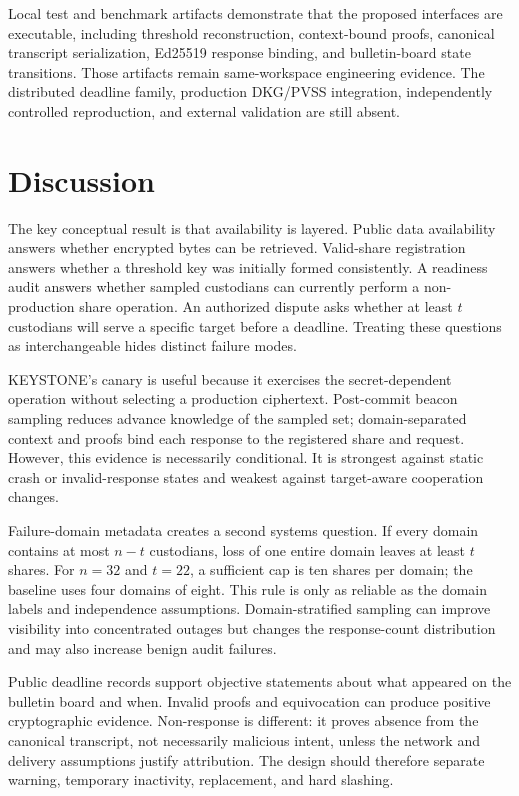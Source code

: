 \documentclass[10pt]{article}
\begin{document}
Local test and benchmark artifacts demonstrate that the proposed interfaces are executable, including threshold reconstruction, context-bound proofs, canonical transcript serialization, Ed25519 response binding, and bulletin-board state transitions. Those artifacts remain same-workspace engineering evidence. The distributed deadline family, production DKG/PVSS integration, independently controlled reproduction, and external validation are still absent.

\section{Discussion}

The key conceptual result is that availability is layered. Public data availability answers whether encrypted bytes can be retrieved. Valid-share registration answers whether a threshold key was initially formed consistently. A readiness audit answers whether sampled custodians can currently perform a non-production share operation. An authorized dispute asks whether at least $t$ custodians will serve a specific target before a deadline. Treating these questions as interchangeable hides distinct failure modes.

KEYSTONE's canary is useful because it exercises the secret-dependent operation without selecting a production ciphertext. Post-commit beacon sampling reduces advance knowledge of the sampled set; domain-separated context and proofs bind each response to the registered share and request. However, this evidence is necessarily conditional. It is strongest against static crash or invalid-response states and weakest against target-aware cooperation changes.

Failure-domain metadata creates a second systems question. If every domain contains at most $n-t$ custodians, loss of one entire domain leaves at least $t$ shares. For $n=32$ and $t=22$, a sufficient cap is ten shares per domain; the baseline uses four domains of eight. This rule is only as reliable as the domain labels and independence assumptions. Domain-stratified sampling can improve visibility into concentrated outages but changes the response-count distribution and may also increase benign audit failures.

Public deadline records support objective statements about what appeared on the bulletin board and when. Invalid proofs and equivocation can produce positive cryptographic evidence. Non-response is different: it proves absence from the canonical transcript, not necessarily malicious intent, unless the network and delivery assumptions justify attribution. The design should therefore separate warning, temporary inactivity, replacement, and hard slashing.
\end{document}
